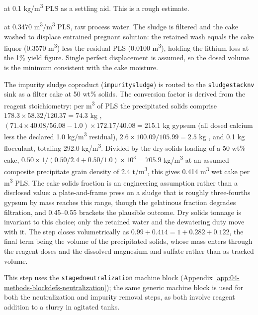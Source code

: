 \documentclass{article}
\renewcommand\_{\textunderscore\allowbreak}
\begin{document}
\begin{description}[noitemsep, topsep=0pt]
\item[\textbullet\enskip Flocculant] at 0.1 \si{kg/m^3} PLS as a settling aid. This is a rough estimate.

\item[\textbullet\enskip Wash water] at 0.3470 \si{m^3/m^3} PLS, raw process water. The sludge is filtered and the cake washed to displace entrained pregnant solution: the retained wash equals the cake liquor (0.3570 \si{m^3}) less the residual PLS (0.0100 \si{m^3}), holding the lithium loss at the 1\% yield figure. Single perfect displacement is assumed, so the dosed volume is the minimum consistent with the cake moisture.

\end{description}

The impurity sludge coproduct (\texttt{impurity\_sludge}) is routed to the \texttt{sludge\_stack\_nv\_50} sink as a filter cake at 50 wt\% solids. The conversion factor is derived from the reagent stoichiometry: per \si{m^3} of PLS the precipitated solids comprise $178.3 \times 58.32/120.37 = 74.3$ kg , 
$(71.4 \times 40.08/56.08 - 1.0) \times 172.17/40.08=215.1$ kg gypsum (all dosed calcium less the declared 1.0 \si{kg/m^3} residual), $2.6 \times 100.09/105.99 = 2.5$ kg , and 0.1 kg flocculant, totaling 292.0 \si{kg/m^3}. Divided by the dry-solids loading of a 50 wt\% cake, $0.50 \times 1/(0.50/2.4 + 0.50/1.0) \times 10^3 = 705.9$ \si{kg/m^3} at an assumed composite precipitate grain density of 2.4 \si{t/m^3}, this gives 0.414 \si{m^3} wet cake per \si{m^3} PLS. The cake solids fraction is an engineering assumption rather than a disclosed value: a plate-and-frame press on a sludge that is roughly three-fourths gypsum by mass reaches this range, though the gelatinous  fraction degrades filtration, and 0.45--0.55 brackets the plausible outcome. Dry solids tonnage is invariant to this choice; only the retained water and the dewatering duty move with it. The step closes volumetrically as $0.99 + 0.414 = 1 + 0.282 + 0.122$, the final term being the volume of the precipitated solids, whose mass enters through the reagent doses and the dissolved magnesium and sulfate rather than as tracked volume.

This step uses the \texttt{staged\_neutralization} machine block (Appendix \ref{app:04-methods-blockdefs-neutralization}); the same generic machine block is used for both the neutralization and impurity removal steps, as both involve reagent addition to a slurry in agitated tanks. 
\end{document}
